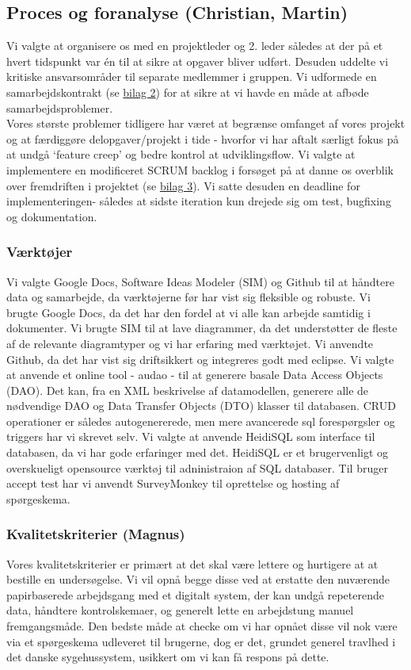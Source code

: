 \subsection*{Proces og foranalyse (Christian, Martin)}
Vi valgte at organisere os med en projektleder og 2. leder således at
der på et hvert tidspunkt var én til at sikre at opgaver bliver udført. Desuden
uddelte vi kritiske ansvarsområder til separate medlemmer i gruppen. Vi
udformede en samarbejdskontrakt (se \hyperref[Bilag2]{bilag 2}) for at sikre at
vi havde en måde at afbøde samarbejdsproblemer.\\
\indent Vores største problemer tidligere har været at begrænse omfanget af
vores projekt og at færdiggøre delopgaver/projekt i tide - hvorfor vi har aftalt
særligt fokus på at undgå ‘feature creep’ og bedre kontrol at udviklingsflow. Vi
valgte at implementere en modificeret SCRUM backlog i forsøget på at danne os
overblik over fremdriften i projektet (se \hyperref[Bilag3]{bilag 3}). Vi satte
desuden en deadline for implementeringen- således at sidste iteration kun
drejede sig om test, bugfixing og dokumentation.
\subsubsection*{Værktøjer}
Vi valgte Google Docs, Software Ideas Modeler (SIM) og Github til at håndtere
data og samarbejde, da værktøjerne før har vist sig fleksible og robuste. Vi
brugte Google Docs, da det har den fordel at vi alle kan arbejde samtidig i
dokumenter. Vi brugte SIM til at lave diagrammer, da det understøtter de fleste
af de relevante diagramtyper og vi har erfaring med værktøjet. Vi anvendte
Github, da det har vist sig driftsikkert og integreres godt med eclipse. Vi
valgte at anvende et online tool - audao\cite{audao} - til at generere
basale Data Access Objects (DAO). Det kan, fra en XML beskrivelse af
datamodellen, generere alle de nødvendige DAO og Data Transfer Objects (DTO)
klasser til databasen. CRUD operationer er således autogenererede, men mere
avancerede sql forespørgsler og triggers har vi skrevet selv. Vi valgte at
anvende HeidiSQL som interface til databasen, da vi har gode erfaringer med det.
HeidiSQL\cite{heidisql} er et brugervenligt og overskueligt opensource værktøj
til adninistraion af SQL databaser. Til bruger accept test har vi anvendt
SurveyMonkey\cite{surveymonkey} til oprettelse og hosting af spørgeskema.
\subsubsection*{Kvalitetskriterier (Magnus)}
Vores kvalitetskriterier er primært at det skal være lettere og hurtigere at at
bestille en undersøgelse. Vi vil opnå begge disse ved at erstatte den nuværende
papirbaserede arbejdsgang med et digitalt system, der kan undgå repeterende
data, håndtere kontrolskemaer, og generelt lette en arbejdstung manuel
fremgangsmåde. Den bedste måde at checke om vi har opnået disse vil nok være via
et spørgeskema udleveret til brugerne, dog er det, grundet generel travlhed i
det danske sygehussystem, usikkert om vi kan få respons på dette.
